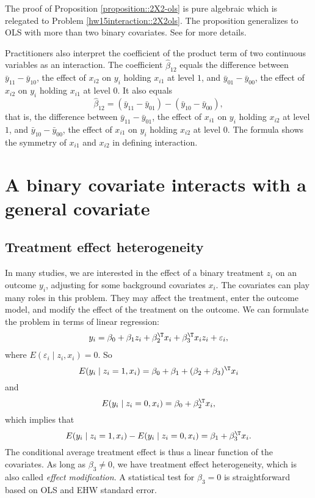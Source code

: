 The proof of Proposition \ref{proposition::2X2-ols} is pure algebraic which is relegated to Problem \ref{hw15interaction::2X2ols}. 
The proposition generalizes to OLS with more than two binary covariates. See \citet{zhao2021regression} for more details. 


Practitioners also interpret the coefficient of the product term of two continuous variables as an interaction. The coefficient $\hat{\beta}_{12}$ equals the difference between $\bar{y}_{11}-\bar{y}_{10}$, the effect of $x_{i2}$ on $y_i$ holding $x_{i1}$ at level $1$, and $\bar{y}_{01}-\bar{y}_{00}$, the effect of $x_{i2}$ on $y_i$ holding $x_{i1}$ at level $0$. It also equals 
$$
\hat{\beta}_{12}  =  (\bar{y}_{11}-\bar{y}_{01})-(\bar{y}_{10}-\bar{y}_{00}),
$$
that is, the difference between $\bar{y}_{11}-\bar{y}_{01} $, the effect of $x_{i1}$ on $y_i$ holding $x_{i2}$ at level $1$, and $\bar{y}_{10}-\bar{y}_{00}$, the effect of $x_{i1}$ on $y_i$ holding $x_{i2}$ at level $0$. The formula shows the symmetry of $x_{i1} $ and $x_{i2}$ in defining interaction. 




\section{A binary covariate interacts with a general covariate}


\subsection{Treatment effect heterogeneity}


In many studies, we are interested in the effect of a binary treatment $z_i$ on an outcome $y_i$, adjusting for some background covariates $x_i$. The covariates can play many roles in this problem. They may affect the treatment, enter the outcome model, and modify the effect of the treatment on the outcome. We can formulate the problem in terms of linear regression: 
\begin{eqnarray}
\label{eq::ols-interaction}
y_i =  \beta_0 + \beta_1 z_i + \beta_2^{\T} x_i + \beta_3^{\T} x_iz_i  + \varepsilon_i ,
\end{eqnarray}
where $E( \varepsilon_i \mid z_i, x_i ) = 0$. So
$$
E(y_i \mid z_i = 1, x_i) =  \beta_0 + \beta_1 + (\beta_2 + \beta_3)^{\T} x_i
$$
and
$$
E(y_i \mid z_i = 0, x_i) =  \beta_0   + \beta_2  ^{\T} x_i,
$$
which implies that
$$
E(y_i \mid z_i = 1, x_i)  - E(y_i \mid z_i = 0, x_i)  = \beta_1 + \beta_3^{\T} x_i.
$$
The conditional average treatment effect is thus a linear function of the covariates. As long as $\beta_3 \neq 0$, we have treatment effect heterogeneity, which is also called {\it effect modification}. A statistical test for $\beta_3 = 0$ is straightforward based on OLS and EHW standard error. 

